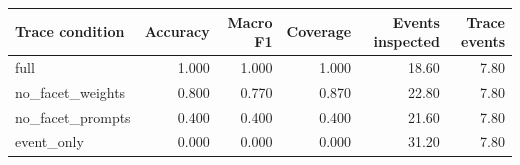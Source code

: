 \begin{tabular}{lrrrrr}
\toprule
Trace condition & Accuracy & Macro F1 & Coverage & Events inspected & Trace events \\
\midrule
full & 1.000 & 1.000 & 1.000 & 18.60 & 7.80 \\
no\_facet\_weights & 0.800 & 0.770 & 0.870 & 22.80 & 7.80 \\
no\_facet\_prompts & 0.400 & 0.400 & 0.400 & 21.60 & 7.80 \\
event\_only & 0.000 & 0.000 & 0.000 & 31.20 & 7.80 \\
\bottomrule
\end{tabular}

